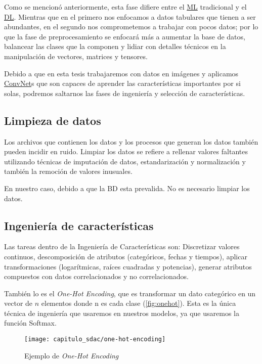 Como se mencionó anteriormente, esta fase difiere entre el \hyperlink{abbr}{ML}
tradicional y el \hyperlink{abbr}{DL}. Mientras que en el primero nos enfocamos
a datos tabulares que tienen a ser abundantes, en el segundo nos comprometemos a
trabajar con pocos datos; por lo que la fase de preprocesamiento se enfocará más
a aumentar la base de datos, balancear las clases que la componen y lidiar con
detalles técnicos en la manipulación de vectores, matrices y tensores.

Debido a que en esta tesis trabajaremos con datos en imágenes y aplicamos
\hyperlink{abbr}{ConvNet}s que son capaces de aprender las características
importantes por si solas, podremos saltarnos las fases de ingeniería y selección
de características.

\subsection{Limpieza de datos}

Los archivos que contienen los datos y los procesos que generan los datos
también pueden incidir en ruido. Limpiar los datos se refiere a rellenar valores
faltantes utilizando técnicas de imputación de datos, estandarización y
normalización y también la remoción de valores inusuales.

En nuestro caso, debido a que la BD esta prevalida. No es necesario
limpiar los datos.

\subsection{Ingeniería de características}

Las tareas dentro de la Ingeniería de Características son: Discretizar valores
continuos, descomposición de atributos (categóricos, fechas y tiempos), aplicar
transformaciones (logarítmicas, raíces cuadradas y potencias), generar
atributos compuestos con datos correlacionados y no correlacionados.

También lo es el \emph{One-Hot Encoding}, que es transformar un dato categórico
en un vector de $ n $ elementos donde n es cada clase (\autoref{fig:onehot}).
Esta es la única técnica de ingeniería que usaremos en nuestros modelos, ya que
usaremos la función Softmax.

\begin{figure}[H]
    \centering
    \texttt{[image: capitulo\_sdac/one-hot-encoding]}
    \caption{Ejemplo de \emph{One-Hot Encoding}}\label{fig:onehot}
\end{figure}

